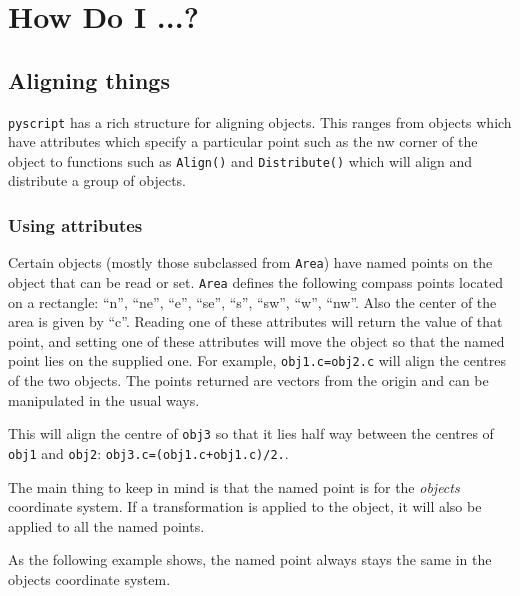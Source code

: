 \documentclass[a4paper]{book}
\begin{document}
\chapter{How Do I ...?}
\label{cha:howto}

\section{Aligning things}

\Verb|pyscript| has a rich structure for aligning objects. This ranges
from objects which have attributes which specify a particular point
such as the nw corner of the object to functions such as
\Verb|Align()| and \Verb|Distribute()| which will align and distribute a 
group of objects.

\subsection{Using attributes}

Certain objects (mostly those subclassed from \Verb|Area|) have named points
on the object that can be read or set. \Verb|Area| defines the
following compass points located on a rectangle: ``n'', ``ne'',
``e'', ``se'', ``s'', ``sw'', ``w'', ``nw''. Also the center of the
area is given by ``c''. Reading one of these attributes will return
the value of that point, and setting one of
these attributes will move the object so that the named point lies
on the supplied one. For example, \Verb|obj1.c=obj2.c| will align the
centres of the two objects. The points returned are vectors from the origin 
and can be manipulated in the usual ways.
\begin{example}
  This will align the centre of \Verb|obj3| so that it lies half way
  between the centres of \Verb|obj1| and \Verb|obj2|:
  \Verb|obj3.c=(obj1.c+obj1.c)/2.|.
\end{example}

The main thing to keep in mind is that the named point is for the
\emph{objects} coordinate system. If a transformation is applied to
the object, it will also be applied to all the named points.
\begin{example}
  As the following example shows, the named point always stays the same 
  in the objects coordinate system.
\end{example}

\end{document}
